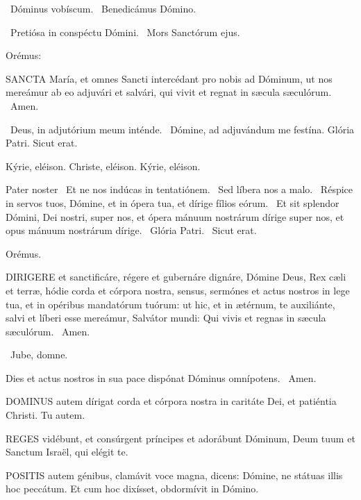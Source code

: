 \V\ Dóminus vobíscum. \V\ Benedicámus Dómino.


\V\ Pretiósa in conspéctu Dómini. \R\ Mors Sanctórum ejus.

 Orémus:


\lettrine[lines=2]{S}{ANCTA} María, et omnes Sancti intercédant pro nobis ad Dóminum, ut nos mereámur ab eo adjuvári et salvári, qui vivit et regnat in sæcula sæculórum. \R\ Amen.

\V\ Deus, in adjutórium meum inténde. \R\ Dómine, ad adjuvándum me festína.  Glória Patri. Sicut erat.

Kýrie, eléison. Christe, eléison. Kýrie, eléison.

Pater noster  \V\ Et ne nos indúcas in tentatiónem. \R\ Sed líbera nos a malo. \V\ Réspice in servos tuos, Dómine, et in ópera tua, et dírige fílios eórum. \R\ Et sit splendor Dómini, Dei nostri, super nos, et ópera mánuum nostrárum dírige super nos, et opus mánuum nostrárum dírige. \V\ Glória Patri. \R\ Sicut erat.

Orémus. 

\lettrine[lines=2]{D}{IRIGERE} et sanctificáre, régere et gubernáre dignáre, Dómine Deus, Rex cæli et terræ, hódie corda et córpora nostra, sensus, sermónes et actus nostros in lege tua, et in opéribus mandatórum tuórum: ut hic, et in ætérnum, te auxiliánte, salvi et líberi esse mereámur, Salvátor mundi: Qui vivis et regnas in sæcula sæculórum. \R\ Amen.

\V\ Jube, domne.

 Dies et actus nostros in sua pace dispónat Dóminus omnípotens. \R\ Amen.


\lettrine[lines=2]{D}{OMINUS} autem dírigat corda et córpora nostra in caritáte Dei, et patiéntia Christi. Tu autem.



\lettrine[lines=2]{R}{EGES} vidébunt, et consúrgent príncipes et adorábunt Dóminum, Deum tuum et Sanctum Israël, qui elégit te.


\lettrine[lines=2]{P}{OSITIS} autem génibus, clamávit voce magna, dicens: Dómine, ne státuas illis hoc peccátum. Et cum hoc dixísset, obdormívit in Dómino.

